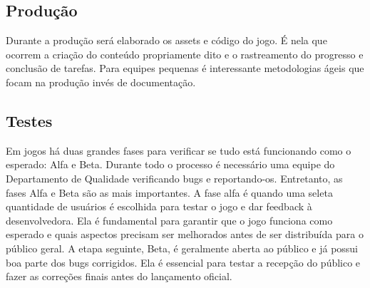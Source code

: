 \documentclass[12pt, 
openright, 
oneside, 
a4paper,    
brazil]{facom-ufu-abntex2}
\begin{document}
\subsection{Produção}
Durante a produção será elaborado os assets e código do jogo. É nela que ocorrem a criação do conteúdo propriamente dito e o rastreamento do progresso e conclusão de tarefas\cite{Manualdejogosdigitais}. Para equipes pequenas é interessante metodologias ágeis que focam na produção invés de documentação.

\subsection{Testes}
Em jogos há duas grandes fases para verificar se tudo está funcionando como o esperado: Alfa e Beta. Durante todo o processo é necessário uma equipe do Departamento de Qualidade verificando bugs e reportando-os. Entretanto, as fases Alfa e Beta são as mais importantes. A fase alfa é quando uma seleta quantidade de usuários é escolhida para testar o jogo e dar feedback à desenvolvedora. Ela é fundamental para garantir que o jogo funciona como esperado e quais aspectos precisam ser melhorados antes de ser distribuída para o público geral. A etapa seguinte, Beta, é geralmente aberta ao público e já possui boa parte dos bugs corrigidos. Ela é essencial para testar a recepção do público e fazer as correções finais antes do lançamento oficial.
\end{document}
